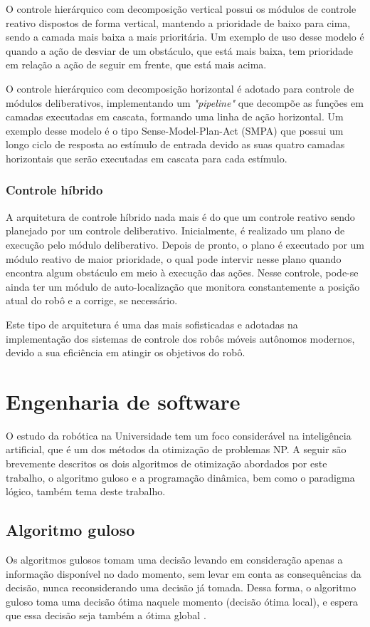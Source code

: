 O controle hierárquico com decomposição vertical possui os módulos de controle reativo dispostos de forma vertical, mantendo a prioridade de baixo para cima, sendo a camada mais baixa a mais prioritária. Um exemplo de uso desse modelo é quando a ação de desviar de um obstáculo, que está mais baixa, tem prioridade em relação a ação de seguir em frente, que está mais acima.

O controle hierárquico com decomposição horizontal é adotado para controle de módulos deliberativos, implementando um \textit{"pipeline"} que decompõe as funções em camadas executadas em cascata, formando uma linha de ação horizontal. Um exemplo desse modelo é o tipo Sense-Model-Plan-Act (SMPA) que possui um longo ciclo de resposta ao estímulo de entrada devido as suas quatro camadas horizontais que serão executadas em cascata para cada estímulo.

\subsubsection{Controle híbrido}
A arquitetura de controle híbrido nada mais é do que um controle reativo sendo planejado por um controle deliberativo. Inicialmente, é realizado um plano de execução pelo módulo deliberativo. Depois de pronto, o plano é executado por um módulo reativo de maior prioridade, o qual pode intervir nesse plano quando encontra algum obstáculo em meio à execução das ações. Nesse controle, pode-se ainda ter um módulo de auto-localização que monitora constantemente a posição atual do robô e a corrige, se necessário.

Este tipo de arquitetura é uma das mais sofisticadas e adotadas na implementação dos sistemas de controle dos robôs móveis autônomos modernos, devido a sua eficiência em atingir os objetivos do robô. 

\section{Engenharia de software}
O estudo da robótica na Universidade tem um foco considerável na inteligência artificial, que é um dos métodos da otimização de problemas NP. A seguir são brevemente descritos os dois algoritmos de otimização abordados por este trabalho, o algoritmo guloso e a programação dinâmica, bem como o paradigma lógico, também tema deste trabalho.
\subsection{Algoritmo guloso}
Os algoritmos gulosos tomam uma decisão levando em consideração apenas a informação disponível no dado momento, sem levar em conta as consequências da decisão, nunca reconsiderando uma decisão já tomada. Dessa forma, o algoritmo guloso toma uma decisão ótima naquele momento (decisão ótima local), e espera que essa decisão seja também a ótima global \cite{anderson2004}.
